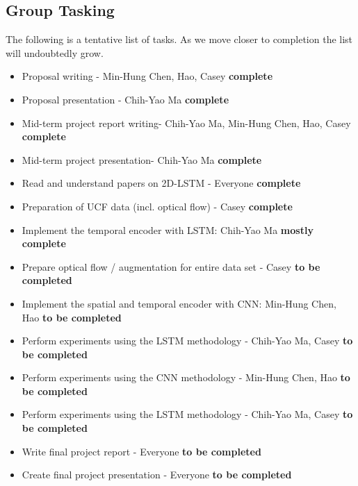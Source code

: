 \subsection*{Group Tasking}
The following is a tentative list of tasks. As we move closer to completion the list will undoubtedly grow. 
\begin{itemize}
\item Proposal writing - Min-Hung Chen, Hao, Casey \qquad \textbf{complete}
\item Proposal presentation - Chih-Yao Ma \qquad \textbf{complete}
\item Mid-term project report writing- Chih-Yao Ma, Min-Hung Chen, Hao, Casey \qquad \textbf{complete}
\item Mid-term project presentation- Chih-Yao Ma \qquad \textbf{complete}
\item Read and understand papers on 2D-LSTM - Everyone \qquad \textbf{complete}
\item Preparation of UCF data (incl. optical flow) - Casey \qquad \textbf{complete}
\item Implement the temporal encoder with LSTM: Chih-Yao Ma \qquad \textbf{mostly complete}
\item Prepare optical flow / augmentation for entire data set - Casey  \textbf{to be completed}
\item Implement the spatial and temporal encoder with CNN: Min-Hung Chen, Hao \textbf{to be completed}
\item Perform experiments using the LSTM methodology - Chih-Yao Ma, Casey \textbf{to be completed}
\item Perform experiments using the CNN methodology - Min-Hung Chen, Hao \textbf{to be completed}
\item Perform experiments using the LSTM methodology - Chih-Yao Ma, Casey \textbf{to be completed}
	
\item Write final project report - Everyone \textbf{to be completed}
\item Create final project presentation - Everyone \textbf{to be completed}
\end{itemize}

